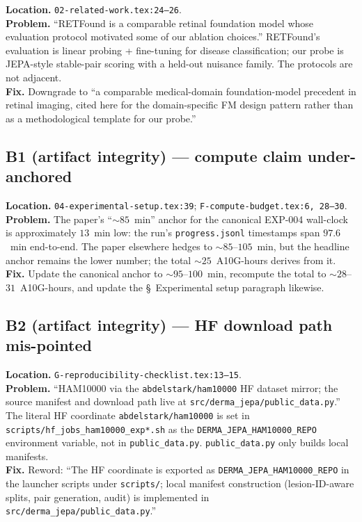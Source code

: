 \documentclass[11pt,a4paper]{article}
\begin{document}
\textbf{Location.} \texttt{02-related-work.tex:24--26}.\\
\textbf{Problem.} ``RETFound \citep{zhou2023retfound} is a comparable retinal
foundation model whose evaluation protocol motivated some of our ablation
choices.'' RETFound's evaluation is linear probing + fine-tuning for disease
classification; our probe is JEPA-style stable-pair scoring with a held-out
nuisance family. The protocols are not adjacent.\\
\textbf{Fix.} Downgrade to ``a comparable medical-domain foundation-model
precedent in retinal imaging, cited here for the domain-specific FM design
pattern rather than as a methodological template for our probe.''

\subsection*{B1 (artifact integrity) --- compute claim under-anchored}

\textbf{Location.} \texttt{04-experimental-setup.tex:39}; \texttt{F-compute-budget.tex:6, 28--30}.\\
\textbf{Problem.} The paper's ``$\sim$$85$~min'' anchor for the canonical
EXP-004 wall-clock is approximately $13$~min low: the run's
\texttt{progress.jsonl} timestamps span $97.6$~min end-to-end. The paper
elsewhere hedges to $\sim$$85$--$105$~min, but the headline anchor remains
the lower number; the total $\sim$$25$~A10G-hours derives from it.\\
\textbf{Fix.} Update the canonical anchor to $\sim$$95$--$100$~min,
recompute the total to $\sim$$28$--$31$~A10G-hours, and update the
\S~Experimental setup paragraph likewise.

\subsection*{B2 (artifact integrity) --- HF download path mis-pointed}

\textbf{Location.} \texttt{G-reproducibility-checklist.tex:13--15}.\\
\textbf{Problem.} ``HAM10000 via the \texttt{abdelstark/ham10000} HF dataset
mirror; the source manifest and download path live at
\texttt{src/derma\_jepa/public\_data.py}.'' The literal HF coordinate
\texttt{abdelstark/ham10000} is set in \texttt{scripts/hf\_jobs\_ham10000\_exp*.sh}
as the \texttt{DERMA\_JEPA\_HAM10000\_REPO} environment variable, not in
\texttt{public\_data.py}. \texttt{public\_data.py} only builds local
manifests.\\
\textbf{Fix.} Reword: ``The HF coordinate is exported as
\texttt{DERMA\_JEPA\_HAM10000\_REPO} in the launcher scripts under
\texttt{scripts/}; local manifest construction (lesion-ID-aware splits, pair
generation, audit) is implemented in \texttt{src/derma\_jepa/public\_data.py}.''
\end{document}
